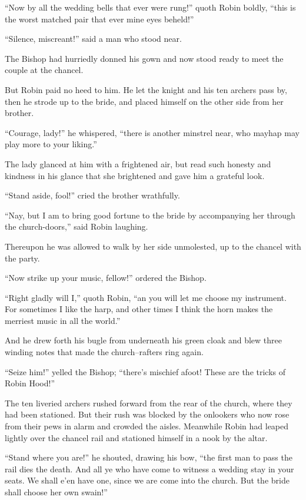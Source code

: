 ``Now by all the wedding bells that ever were rung!'' quoth Robin
boldly, ``this is the worst matched pair that ever mine eyes beheld!''

``Silence, miscreant!'' said a man who stood near.

The Bishop had hurriedly donned his gown and now stood ready to meet the
couple at the chancel.

But Robin paid no heed to him. He let the knight and his ten archers
pass by, then he strode up to the bride, and placed himself on the other
side from her brother.

``Courage, lady!'' he whispered, ``there is another minstrel near, who
mayhap may play more to your liking.''

The lady glanced at him with a frightened air, but read such honesty and
kindness in his glance that she brightened and gave him a grateful look.

``Stand aside, fool!'' cried the brother wrathfully.

``Nay, but I am to bring good fortune to the bride by accompanying her
through the church-doors,'' said Robin laughing.

Thereupon he was allowed to walk by her side unmolested, up to the
chancel with the party.

``Now strike up your music, fellow!'' ordered the Bishop.

``Right gladly will I,'' quoth Robin, ``an you will let me choose my
instrument. For sometimes I like the harp, and other times I think the
horn makes the merriest music in all the world.''

And he drew forth his bugle from underneath his green cloak and blew
three winding notes that made the church--rafters ring again.

``Seize him!'' yelled the Bishop; ``there's mischief afoot! These are
the tricks of Robin Hood!''

The ten liveried archers rushed forward from the rear of the church,
where they had been stationed. But their rush was blocked by the
onlookers who now rose from their pews in alarm and crowded the aisles.
Meanwhile Robin had leaped lightly over the chancel rail and stationed
himself in a nook by the altar.

``Stand where you are!'' he shouted, drawing his bow, ``the first man to
pass the rail dies the death. And all ye who have come to witness a
wedding stay in your seats. We shall e'en have one, since we are come
into the church. But the bride shall choose her own swain!''

